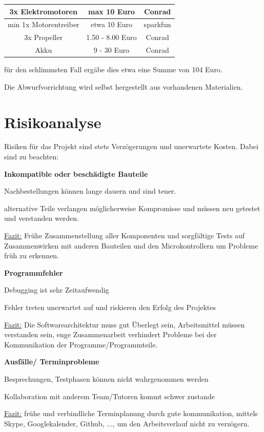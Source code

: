 \documentclass[lang=ngerman,inputenc=utf8,fontsize=10pt]{ldvarticle}
\begin{document}
\begin{tabular}{|c|c|c|}
\hline
3x Elektromotoren & max 10 Euro & Conrad \\
\hline
min 1x Motorentreiber & etwa 10 Euro & sparkfun \\
\hline
3x Propeller & 1.50 - 8.00 Euro & Conrad \\
\hline
Akku & 9 - 30 Euro & Conrad \\
\hline
\end{tabular}

für den schlimmsten Fall ergäbe dies etwa eine Summe von 104 Euro.

Die Abwurfvorrichtung wird selbst hergestellt aus vorhandenen Materialien.




\section{Risikoanalyse}

Risiken für das Projekt sind stets Verzögerungen und unerwartete Kosten. Dabei sind zu beachten:

\textbf{Inkompatible oder beschädigte Bauteile}
\begin{list}{->}{}
\item Nachbestellungen können lange dauern und sind teuer.
\item alternative Teile verlangen möglicherweise Kompromisse und müssen neu getestet und verstanden werden.
\end{list}
\underline{Fazit:} Frühe Zusammenstellung aller Komponenten und sorgfältige Tests auf Zusammenwirken mit anderen Bauteilen und den Microkontrollern um Probleme früh zu erkennen.


\textbf{Programmfehler}
\begin{list}{->}{}
\item Debugging ist sehr Zeitaufwendig
\item Fehler treten unerwartet auf und riskieren den Erfolg des Projektes
\end{list}

\underline{Fazit:} Die Softwarearchitektur muss gut Überlegt sein, Arbeitsmittel müssen verstanden sein, enge Zusammenarbeit verhindert Probleme bei der Kommunikation der Programme/Programmteile.


\textbf{Ausfälle/ Terminprobleme}
\begin{list}{->}{}
\item Besprechungen, Testphasen können nicht wahrgenommen werden
\item Kollaboration mit anderem Team/Tutoren kommt schwer zustande
\end{list}
\underline{Fazit:} frühe und verbindliche Terminplanung durch gute kommunikation, mittels Skype, Googlekalender, Github, ..., um den Arbeitsverlauf nicht zu verzögern.
\end{document}
